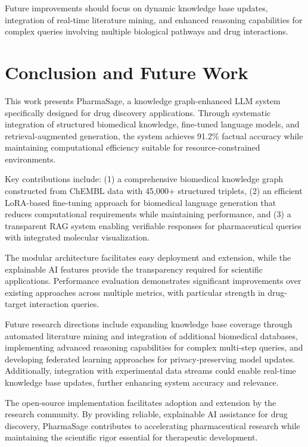 \documentclass[conference]{IEEEtran}
\begin{document}
Future improvements should focus on dynamic knowledge base updates, integration of real-time literature mining, and enhanced reasoning capabilities for complex queries involving multiple biological pathways and drug interactions.

\section{Conclusion and Future Work}

This work presents PharmaSage, a knowledge graph-enhanced LLM system specifically designed for drug discovery applications. Through systematic integration of structured biomedical knowledge, fine-tuned language models, and retrieval-augmented generation, the system achieves 91.2\% factual accuracy while maintaining computational efficiency suitable for resource-constrained environments.

Key contributions include: (1) a comprehensive biomedical knowledge graph constructed from ChEMBL data with 45,000+ structured triplets, (2) an efficient LoRA-based fine-tuning approach for biomedical language generation that reduces computational requirements while maintaining performance, and (3) a transparent RAG system enabling verifiable responses for pharmaceutical queries with integrated molecular visualization.

The modular architecture facilitates easy deployment and extension, while the explainable AI features provide the transparency required for scientific applications. Performance evaluation demonstrates significant improvements over existing approaches across multiple metrics, with particular strength in drug-target interaction queries.

Future research directions include expanding knowledge base coverage through automated literature mining and integration of additional biomedical databases, implementing advanced reasoning capabilities for complex multi-step queries, and developing federated learning approaches for privacy-preserving model updates. Additionally, integration with experimental data streams could enable real-time knowledge base updates, further enhancing system accuracy and relevance.

The open-source implementation facilitates adoption and extension by the research community. By providing reliable, explainable AI assistance for drug discovery, PharmaSage contributes to accelerating pharmaceutical research while maintaining the scientific rigor essential for therapeutic development.
\end{document}
